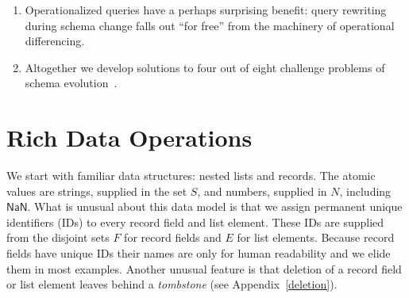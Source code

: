 \documentclass[english,submission]{programming}
\theoremstyle{definition}
\newcommand{\mathbox}[1]{\colorbox{black!10}{$#1$}}
\begin{document}
\begin{enumerate}
\item Operationalized queries have a perhaps surprising benefit: query rewriting~\cite{curino08, herrmann17} during schema change falls out ``for free'' from the machinery of operational differencing.


\item Altogether we develop solutions to four out of eight challenge problems of schema evolution~\cite{challenge-problems}.

\end{enumerate}







\section{Rich Data Operations}\label{rich-data}

We start with familiar data structures: nested lists and records. The atomic values are strings, supplied in the set \mathbox{S}, and numbers, supplied in \mathbox{N}, including \mathbox{\textsf{NaN}}. What is unusual about this data model is that we assign permanent unique identifiers (IDs) to every record field and list element. These IDs are supplied from the disjoint sets \mathbox{F} for record fields and \mathbox{E} for list elements. Because record fields have unique IDs their names are only for human readability and we elide them in most examples. Another unusual feature is that deletion of a record field or list element leaves behind a \textit{tombstone} (see Appendix~\ref{deletion}).
\end{document}
